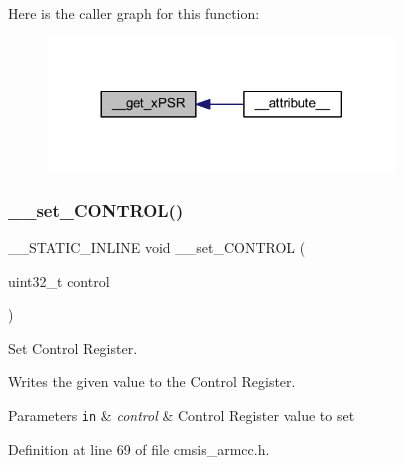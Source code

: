Here is the caller graph for this function\+:
\nopagebreak
\begin{figure}[H]
\begin{center}
\leavevmode
\includegraphics[width=260pt]{group___c_m_s_i_s___core___reg_acc_functions_ga94c675a736d4754a5f73d8748b24aa11_icgraph}
\end{center}
\end{figure}
\mbox{\label{group___c_m_s_i_s___core___reg_acc_functions_ga558df7eeb0a34765e0b54d9853d08484}} 
\subsubsection{\texorpdfstring{\+\_\+\+\_\+set\+\_\+\+C\+O\+N\+T\+R\+O\+L()}{\_\_set\_CONTROL()}}
{\footnotesize\ttfamily \+\_\+\+\_\+\+S\+T\+A\+T\+I\+C\+\_\+\+I\+N\+L\+I\+NE void \+\_\+\+\_\+set\+\_\+\+C\+O\+N\+T\+R\+OL (\begin{DoxyParamCaption}\item[{uint32\+\_\+t}]{control }\end{DoxyParamCaption})}



Set Control Register. 

Writes the given value to the Control Register. 
\begin{DoxyParams}[1]{Parameters}
\mbox{\tt in}  & {\em control} & Control Register value to set \\
\hline
\end{DoxyParams}


Definition at line 69 of file cmsis\+\_\+armcc.\+h.

